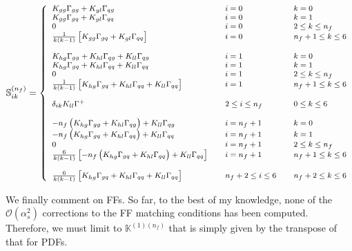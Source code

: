 \documentclass[10pt,a4paper]{article}
\begin{document}
\begin{equation}
\footnotesize
\mathbb{S}_{ik}^{(n_f)} =
\left\{
\begin{array}{lll}
K_{gg}\Gamma_{gg}+K_{gl}\Gamma_{qg} &
                                                                      \quad i = 0 &\quad k = 0\\
K_{gg}\Gamma_{gq}+K_{gl}\Gamma_{qq} & \quad i = 0 &\quad k =1\\
0 & \quad i = 0 &\quad  2\leq k \leq n_f\\
\frac1{k(k-1)}\left[K_{gg}\Gamma_{gq}+K_{gl}\Gamma_{qq}\right] & \quad i = 0 &\quad  n_f+ 1\leq k \leq 6\\
\\
K_{hg}\Gamma_{gg}+K_{hl}\Gamma_{qg}+K_{ll}\Gamma_{qg} & \quad i = 1&\quad  k=0\\
K_{hg}\Gamma_{gq}+K_{hl}\Gamma_{qq}+K_{ll}\Gamma_{qq}& \quad i = 1 &\quad  k=1\\
0 & \quad i = 1 &\quad  2\leq k \leq n_f\\
\frac{1}{k(k-1)}\left[K_{hg}\Gamma_{gq}+K_{hl}\Gamma_{qq}+K_{ll}\Gamma_{qq}\right] & \quad i = 1 &\quad  n_f+1\leq k\leq 6\\
\\
\delta_{ik}K_{ll}\Gamma^+&\quad 2\leq i \leq n_f &\quad 0\leq k
                                                         \leq 6\\
\\
-n_f \left(K_{hg}\Gamma_{gg}+K_{hl}\Gamma_{qg}\right)+K_{ll}\Gamma_{qg}&\quad i = n_f+1 &\quad k =0\\
-n_f \left(K_{hg}\Gamma_{gq}+K_{hl}\Gamma_{qq}\right)+K_{ll}\Gamma_{qq}&\quad i = n_f+1 &\quad k =1\\
0 & \quad i = n_f+1 &\quad  2\leq k \leq n_f\\
  \frac{6}{k(k-1)}\left[-n_f \left(K_{hg}\Gamma_{gq}+K_{hl}\Gamma_{qq}\right)+K_{ll}\Gamma_{qq}\right]
&\quad i = n_f+1 &\quad n_f+1 \leq k \leq 6\\
\\
  \frac{6}{k(k-1)}\left[K_{hg}\Gamma_{gq}+K_{hl}\Gamma_{qq}+K_{ll}\Gamma_{qq} \right]
& \quad n_f+2\leq i \leq 6 &\quad  n_f+
                                                            2\leq k
                                                            \leq 6\\
\end{array}
\right.
\end{equation}


\newpage

We finally comment on FFs. So far, to the best of my knowledge, none
of the $\mathcal{O}(\alpha_s^2)$ corrections to the FF matching
conditions has been computed. Therefore, we must limit to
$\mathbb{K}^{(1)(n_f)}$ that is simply given by the transpose of that
for PDFs.
\end{document}
